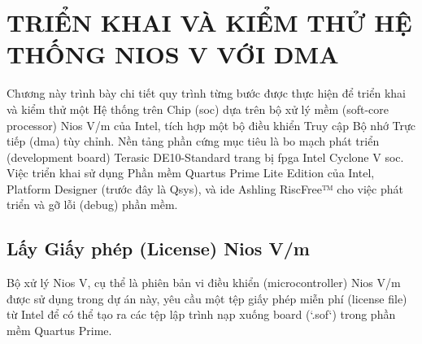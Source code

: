 \chapter{TRIỂN KHAI VÀ KIỂM THỬ HỆ THỐNG NIOS V VỚI DMA}
\label{Chapter3} %

Chương này trình bày chi tiết quy trình từng bước được thực hiện để triển khai và kiểm thử một Hệ thống trên Chip (\acrshort{soc}) dựa trên bộ xử lý mềm (soft-core processor) Nios V/m của Intel, tích hợp một bộ điều khiển Truy cập Bộ nhớ Trực tiếp (\acrfull{dma}) tùy chỉnh. Nền tảng phần cứng mục tiêu là bo mạch phát triển (development board) Terasic DE10-Standard trang bị \acrshort{fpga} Intel Cyclone V \acrshort{soc}. Việc triển khai sử dụng Phần mềm Quartus Prime Lite Edition của Intel, Platform Designer (trước đây là Qsys), và \acrshort{ide} Ashling RiscFree™ cho việc phát triển và gỡ lỗi (debug) phần mềm.

\section{Lấy Giấy phép (License) Nios V/m}
\label{sec:get_license} %

Bộ xử lý Nios V, cụ thể là phiên bản vi điều khiển (microcontroller) Nios V/m được sử dụng trong dự án này, yêu cầu một tệp giấy phép miễn phí (license file) từ Intel để có thể tạo ra các tệp lập trình nạp xuống board (`.sof`) trong phần mềm Quartus Prime. 

